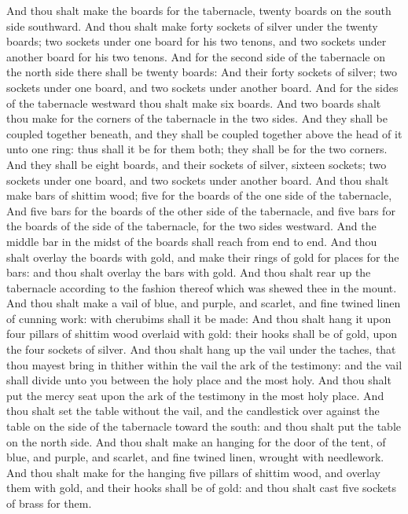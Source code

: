 \begin{biblechapter}
\verse And thou shalt make the boards for the tabernacle, twenty boards on the south side southward.
\verse And thou shalt make forty sockets of silver under the twenty boards; two sockets under one board for his two tenons, and two sockets under another board for his two tenons.
\verse And for the second side of the tabernacle on the north side there shall be twenty boards:
\verse And their forty sockets of silver; two sockets under one board, and two sockets under another board.
\verse And for the sides of the tabernacle westward thou shalt make six boards.
\verse And two boards shalt thou make for the corners of the tabernacle in the two sides.
\verse And they shall be coupled together beneath, and they shall be coupled together above the head of it unto one ring: thus shall it be for them both; they shall be for the two corners.
\verse And they shall be eight boards, and their sockets of silver, sixteen sockets; two sockets under one board, and two sockets under another board.
\verse And thou shalt make bars of shittim wood; five for the boards of the one side of the tabernacle,
\verse And five bars for the boards of the other side of the tabernacle, and five bars for the boards of the side of the tabernacle, for the two sides westward.
\verse And the middle bar in the midst of the boards shall reach from end to end.
\verse And thou shalt overlay the boards with gold, and make their rings of gold for places for the bars: and thou shalt overlay the bars with gold.
\verse And thou shalt rear up the tabernacle according to the fashion thereof which was shewed thee in the mount.
\verse And thou shalt make a vail of blue, and purple, and scarlet, and fine twined linen of cunning work: with cherubims shall it be made:
\verse And thou shalt hang it upon four pillars of shittim wood overlaid with gold: their hooks shall be of gold, upon the four sockets of silver.
\verse And thou shalt hang up the vail under the taches, that thou mayest bring in thither within the vail the ark of the testimony: and the vail shall divide unto you between the holy place and the most holy.
\verse And thou shalt put the mercy seat upon the ark of the testimony in the most holy place.
\verse And thou shalt set the table without the vail, and the candlestick over against the table on the side of the tabernacle toward the south: and thou shalt put the table on the north side.
\verse And thou shalt make an hanging for the door of the tent, of blue, and purple, and scarlet, and fine twined linen, wrought with needlework.
\verse And thou shalt make for the hanging five pillars of shittim wood, and overlay them with gold, and their hooks shall be of gold: and thou shalt cast five sockets of brass for them.
\end{biblechapter}

